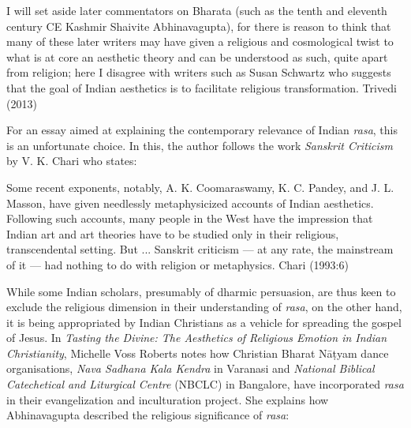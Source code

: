 \begin{myquote}
I will set aside later commentators on Bharata (such as the tenth and eleventh century CE Kashmir Shaivite Abhinavagupta), for there is reason to think that many of these later writers may have given a religious and cosmological twist to what is at core an aesthetic theory and can be understood as such, quite apart from religion; here I disagree with writers such as Susan Schwartz who suggests that the goal of Indian aesthetics is to facilitate religious transformation. 
\hfill Trivedi (2013)
\end{myquote}

For an essay aimed at explaining the contemporary relevance of Indian \textsl{rasa}, this is an unfortunate choice. In this, the author follows the work \textsl{Sanskrit Criticism} by V. K. Chari who states:

\begin{myquote}
Some recent exponents, notably, A. K. Coomaraswamy, K. C. Pandey, and J. L. Masson, have given needlessly metaphysicized accounts of Indian aesthetics. Following such accounts, many people in the West have the impression that Indian art and art theories have to be studied only in their religious, transcendental setting. But ... Sanskrit criticism --- at any rate, the mainstream of it --- had nothing to do with religion or metaphysics. 
\hfill Chari (1993:6)
\end{myquote}

While some Indian scholars, presumably of dharmic persuasion, are thus keen to exclude the religious dimension in their understanding of \textsl{rasa}, on the other hand, it is being appropriated by Indian Christians as a vehicle for spreading the gospel of Jesus. In \textsl{Tasting the Divine: The Aesthetics of Religious Emotion in Indian Christianity}, Michelle Voss Roberts notes how Christian Bharat Nāṭyam dance organisations, \textsl{Nava Sadhana Kala Kendra} in Varanasi and \textsl{National Biblical Catechetical and Liturgical Centre} (NBCLC) in Bangalore, have incorporated \textsl{rasa} in their evangelization and inculturation project. She explains how Abhinavagupta described the religious significance of \textsl{rasa}:

